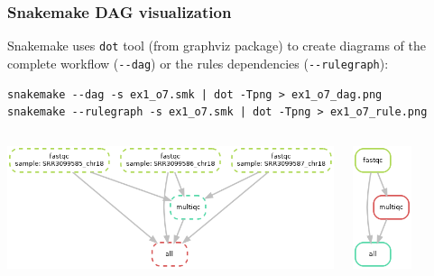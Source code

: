 \begin{frame}[containsverbatim]
\frametitle{Snakemake DAG visualization}
\begin{block}{}
Snakemake uses \verb|dot| tool (from graphviz package) to create diagrams of the complete workflow (\verb|--dag|) or the rules dependencies (\verb|--rulegraph|):
\begin{lstlisting}
snakemake --dag -s ex1_o7.smk | dot -Tpng > ex1_o7_dag.png
snakemake --rulegraph -s ex1_o7.smk | dot -Tpng > ex1_o7_rule.png
\end{lstlisting}
\end{block}
\begin{columns}
   \begin{center}
   \includegraphics[height=3.6cm]{03_workflow/images/ex1_o7_dag.png}
   \end{center}
    \begin{center}
    \includegraphics[height=3.6cm]{03_workflow/images/ex1_o7_rule.png}
    \end{center}
\end{columns}
\end{frame}
